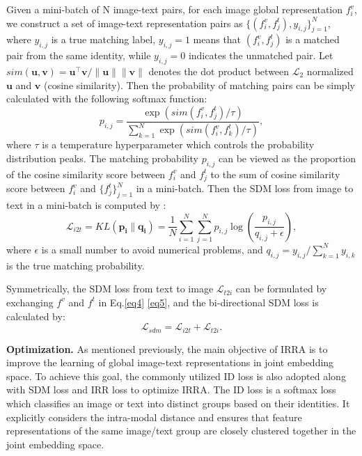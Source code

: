 \documentclass[10pt,twocolumn,letterpaper]{article}
\begin{document}
Given a mini-batch of N image-text pairs, for each image global representation $f^v_i$, we construct a set of image-text representation pairs as $\{(f^v_i, f^t_j), y_{i,j}\}_{j=1}^N $, where $y_{i,j}$ is a true matching label, $y_{i,j} = 1$ means that $(f^v_i, f^t_j)$ is a matched pair from the same identity, while $y_{i,j} = 0$ indicates the unmatched pair. Let $sim(\mathbf{u, v}) = \mathbf{u^\top v}/\|\mathbf{u}\| \|\mathbf{v}\| $ denotes the dot product between $\mathcal{L}_2$ normalized $\mathbf{u}$ and $\mathbf{v}$ (\ie cosine similarity).
Then the probability of matching pairs can be simply calculated with the following softmax function: 
\begin{equation} \label{eq4}
  p_{i,j} = \frac{\exp(sim(f_i^v, f_j^t)/\tau )}{\sum_{k=1}^{N} \exp(sim(f_i^v, f_k^t)/\tau)}, 
\end{equation}
where $\tau$ is a temperature hyperparameter which controls the probability distribution peaks. The matching probability $p_{i,j}$ can be viewed as the proportion of the cosine similarity score between $f_i^v$ and $f_j^t$ to the sum of cosine similarity score between $f_i^v$ and $\{f_j^t\}_{j=1}^{N} $ in a mini-batch. Then the SDM loss from image to text in a mini-batch is computed by :
\begin{equation} \label{eq5}
  \mathcal{L}_{i2t} = KL(\mathbf{p_i}\| \mathbf{q_i}) = \frac{1}{N} \sum_{i=1}^{N}\sum_{j=1}^{N}p_{i,j}\log(\frac{p_{i,j}}{q_{i,j} + \epsilon}), 
\end{equation}
where $\epsilon$ is a small number to avoid numerical problems, and $q_{i,j} = y_{i,j} /\sum_{k=1}^{N}y_{i,k}$ is the true matching probability. 

Symmetrically, the SDM loss from text to image $\mathcal{L}_{t2i}$ can be formulated by exchanging $f^v$ and $f^t$ in Eq.\eqref{eq4} \eqref{eq5}, and the bi-directional SDM loss is calculated by:
\begin{equation}
  \mathcal{L}_{sdm} = \mathcal{L}_{i2t} + \mathcal{L}_{t2i}. 
\end{equation}

\textbf{Optimization.}
As mentioned previously, the main objective of IRRA is to improve the learning of global image-text representations in joint embedding space. To achieve this goal, the commonly utilized ID loss\cite{zheng2020dual} is also adopted along with SDM loss and IRR loss to optimize IRRA. The ID loss is a softmax loss which classifies an image or text into distinct groups based on their identities. It explicitly considers the intra-modal distance and ensures that feature representations of the same image/text group are closely clustered together in the joint embedding space.
\end{document}
